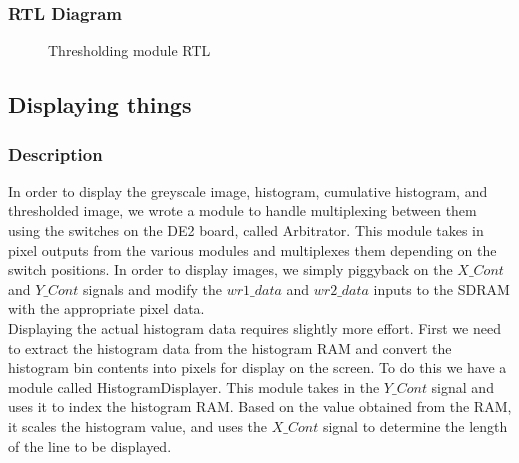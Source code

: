 \documentclass[12pt]{article}
\begin{document}
  \subsubsection{RTL Diagram}
  \begin{figure}[H]
    \caption{Thresholding module RTL}
    \label{fig:thresholder_rtl}
  \end{figure}
  
  
  \subsection{Displaying things}
  \subsubsection{Description}
  In order to display the greyscale image, histogram, cumulative histogram, and thresholded image, we wrote a module to handle multiplexing between them using the switches on the DE2 board, called Arbitrator. This module takes in pixel outputs from the various modules and multiplexes them depending on the switch positions. In order to display images, we simply piggyback on the \(X\_Cont\) and \(Y\_Cont\) signals and modify the \(wr1\_data\) and \(wr2\_data\) inputs to the SDRAM with the appropriate pixel data. \\
      
  Displaying the actual histogram data requires slightly more effort. First we need to extract the histogram data from the histogram RAM and convert the histogram bin contents into pixels for display on the screen. To do this we have a module called HistogramDisplayer. This module takes in the \(Y\_Cont\) signal and uses it to index the histogram RAM. Based on the value obtained from the RAM, it scales the histogram value, and uses the \(X\_Cont\) signal to determine the length of the line to be displayed. 
\end{document}
